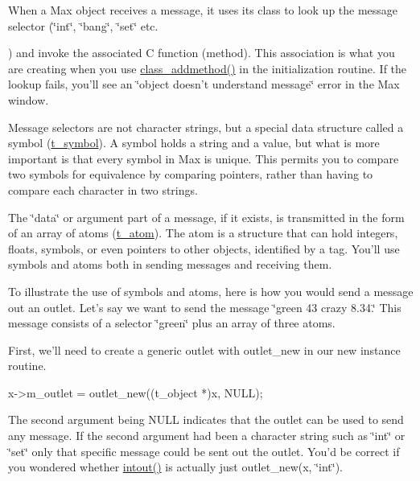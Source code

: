 When a Max object receives a message, it uses its class to look up the message selector (\char`\"{}int\char`\"{}, \char`\"{}bang\char`\"{}, \char`\"{}set\char`\"{} etc.

) and invoke the associated C function (method). This association is what you are creating when you use \hyperlink{group__class_ga1fabf54e0cec8d4e5f732fa347b3f874}{class\_\-addmethod()} in the initialization routine. If the lookup fails, you'll see an \char`\"{}object doesn't understand message\char`\"{} error in the Max window.

Message selectors are not character strings, but a special data structure called a symbol (\hyperlink{structt__symbol}{t\_\-symbol}). A symbol holds a string and a value, but what is more important is that every symbol in Max is unique. This permits you to compare two symbols for equivalence by comparing pointers, rather than having to compare each character in two strings.

The \char`\"{}data\char`\"{} or argument part of a message, if it exists, is transmitted in the form of an array of atoms (\hyperlink{structt__atom}{t\_\-atom}). The atom is a structure that can hold integers, floats, symbols, or even pointers to other objects, identified by a tag. You'll use symbols and atoms both in sending messages and receiving them.

To illustrate the use of symbols and atoms, here is how you would send a message out an outlet. Let's say we want to send the message \char`\"{}green 43 crazy 8.34.\char`\"{} This message consists of a selector \char`\"{}green\char`\"{} plus an array of three atoms.

First, we'll need to create a generic outlet with outlet\_\-new in our new instance routine. 
\begin{DoxyCode}
        x->m_outlet = outlet_new((t_object *)x, NULL);
\end{DoxyCode}


The second argument being NULL indicates that the outlet can be used to send any message. If the second argument had been a character string such as \char`\"{}int\char`\"{} or \char`\"{}set\char`\"{} only that specific message could be sent out the outlet. You'd be correct if you wondered whether \hyperlink{group__inout_ga9b8d897c728eeafa5638d4fc16ff704e}{intout()} is actually just outlet\_\-new(x, \char`\"{}int\char`\"{}).

